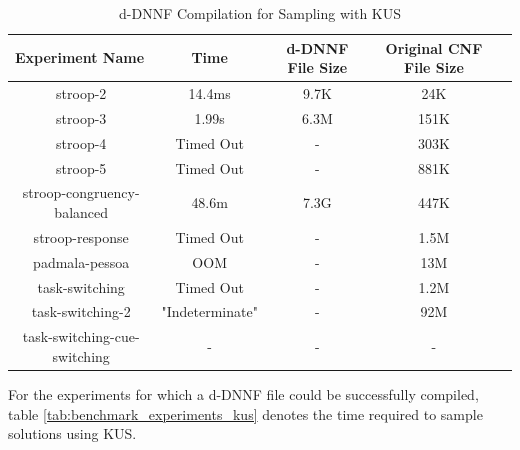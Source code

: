 \begin{table}
  \centering
  \caption{d-DNNF Compilation for Sampling with KUS}
\begin{tabular}{|c|c|c|c|c|}
\hline
\multicolumn{1}{|l|}{Experiment Name} & Time            & d-DNNF File Size     & Original CNF File Size   \\ \hline
stroop-2                              & 14.4ms          & 9.7K                 & 24K                      \\ \hline
stroop-3                              & 1.99s           & 6.3M                 & 151K                     \\ \hline
stroop-4                              & Timed Out       & -                    & 303K                     \\ \hline
stroop-5                              & Timed Out       & -                    & 881K                     \\ \hline
stroop-congruency-balanced            & 48.6m           & 7.3G                 & 447K                     \\ \hline
stroop-response                       & Timed Out       & -                    & 1.5M                     \\ \hline
padmala-pessoa                        & OOM             & -                    & 13M                      \\ \hline
task-switching                        & Timed Out       & -                    & 1.2M                     \\ \hline
task-switching-2                      & "Indeterminate" & -                    & 92M                      \\ \hline %
task-switching-cue-switching          & -               & -                    & -                        \\ \hline
\end{tabular}
\label{tab:benchmark_experiments_d4}
\end{table}


For the experiments for which a d-DNNF file could be successfully compiled, table \ref{tab:benchmark_experiments_kus} denotes the time required to sample solutions using KUS.



